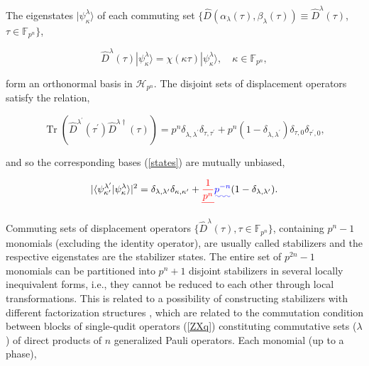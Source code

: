 \documentclass[quantumrep,article,submit,pdftex,moreauthors]{Definitions/mdpi}
\DeclareMathOperator{\Tr}{Tr}
\providecommand{\DIFadd}[1]{{\protect\color{blue}\uwave{#1}}} %
\providecommand{\DIFdel}[1]{{\protect\color{red}\sout{#1}}}                      %
\providecommand{\DIFaddbegin}{} %
\providecommand{\DIFaddend}{} %
\providecommand{\DIFdelbegin}{} %
\providecommand{\DIFdelend}{} %
\begin{document}
The eigenstates $|\psi_\kappa^\lambda\rangle$ of each commuting set
$\{\hat{D}\left(\alpha_{\lambda}(\tau),\beta_{\lambda}(\tau)\right) \equiv
\hat{D}^{\lambda}(\tau)$, $\tau \in \mathbb{F}_{p^{n}}\}$,

\begin{equation}
  \hat{D}^{\lambda}(\tau) |\psi_{\kappa}^{\lambda}\rangle
  = \chi(\kappa \tau) |\psi_{\kappa}^{\lambda }\rangle,
  \quad \kappa \in \mathbb{F}_{p^{n}},
  \label{states}
\end{equation}

form an orthonormal basis in $\mathcal{H}_{p^{n}}$. The disjoint sets of
displacement operators satisfy the relation,

\begin{equation*}
  \Tr\left(
    \hat{D}^{\lambda^{\prime}}(\tau^{\prime})\hat{D}^{\lambda\dagger}(\tau)
  \right)
  = p^{n} \delta_{\lambda,\lambda^{\prime}} \delta_{\tau,\tau^{\prime }}
  + p^{n}(1 - \delta_{\lambda,\lambda^{\prime}}) \delta_{\tau,0}
  \delta_{\tau^{\prime},0},
\end{equation*}

and so the corresponding bases (\ref{states}) are mutually unbiased,

\begin{equation}
  |\langle\psi_{\kappa^{\prime}}^{\lambda^{\prime}}
  |\psi_{\kappa}^{\lambda}\rangle|^{2}
  = \delta_{\lambda,\lambda^{\prime}} \delta_{\kappa,\kappa^{\prime}}
  + \DIFdelbegin \DIFdel{\frac{1}{p^{n}} }\DIFdelend \DIFaddbegin \DIFadd{p^{-n} }\DIFaddend (1-\delta_{\lambda,\lambda^{\prime}}).
  \label{UB}
\end{equation}

Commuting sets of displacement operators $\{\hat{D}^{\lambda }(\tau ),\tau \in
\mathbb{F}_{p^{n}}\}$, containing $p^{n}-1$ monomials (excluding the identity
operator), are usually called stabilizers and the respective eigenstates are the
stabilizer states. The entire set of $p^{2n}-1$ monomials can be partitioned
into $p^{n}+1$ disjoint stabilizers in several locally inequivalent forms, i.e.,
they cannot be reduced to each other through local transformations. This is
related to a possibility of constructing stabilizers with different
factorization structures \cite{factor1,factor2}, which are related to the
commutation condition between blocks of single-qudit operators (\ref{ZXq})
constituting commutative sets (\DIFdelbegin \DIFdel{$\lambda $}\DIFdelend \DIFaddbegin \DIFadd{$\lambda$}\DIFaddend ) of direct products of $n$
generalized Pauli operators. Each monomial (up to a phase),
\end{document}
